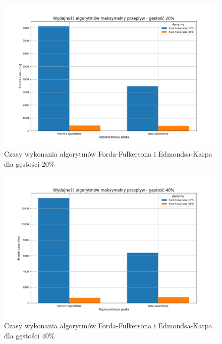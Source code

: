 \documentclass{article}
\begin{document}
\begin{figure}[H]
    \centering
    \includegraphics[scale=0.5]{../Python/charts_type2/Typ2_MAX_FLOW_gestosc20_wykres.png}
    \caption{Czasy wykonania algorytmów Forda-Fulkersona i Edmondsa-Karpa dla gęstości 20\%}
\end{figure}
\begin{figure}[H]
    \centering
    \includegraphics[scale=0.5]{../Python/charts_type2/Typ2_MAX_FLOW_gestosc40_wykres.png}
    \caption{Czasy wykonania algorytmów Forda-Fulkersona i Edmondsa-Karpa dla gęstości 40\%}
\end{figure}
\end{document}
